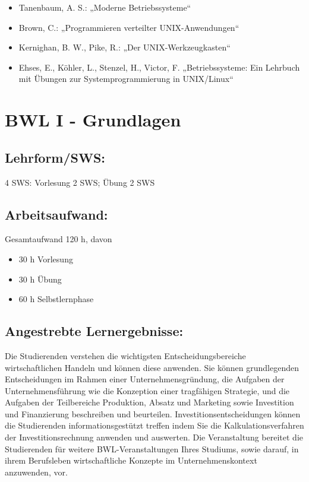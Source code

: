 \begin{itemize}
\tightlist
\item
  Tanenbaum, A. S.: „Moderne Betriebssysteme``
\item
  Brown, C.: „Programmieren verteilter UNIX-Anwendungen``
\item
  Kernighan, B. W., Pike, R.: „Der UNIX-Werkzeugkasten``
\item
  Ehses, E., Köhler, L., Stenzel, H., Victor, F. „Betriebssysteme: Ein
  Lehrbuch mit Übungen zur Systemprogrammierung in UNIX/Linux``
\end{itemize}

\chapter{BWL I - Grundlagen}\label{bwl-i---grundlagen}

\section{Lehrform/SWS:}\label{lehrformsws-6}

4 SWS: Vorlesung 2 SWS; Übung 2 SWS

\section{Arbeitsaufwand:}\label{arbeitsaufwand-6}

Gesamtaufwand 120 h, davon

\begin{itemize}
\tightlist
\item
  30 h Vorlesung
\item
  30 h Übung
\item
  60 h Selbstlernphase
\end{itemize}

\section{Angestrebte
Lernergebnisse:}\label{angestrebte-lernergebnisse-6}

Die Studierenden verstehen die wichtigsten Entscheidungsbereiche
wirtschaftlichen Handeln und können diese anwenden. Sie können
grundlegenden Entscheidungen im Rahmen einer Unternehmensgründung, die
Aufgaben der Unternehmensführung wie die Konzeption einer tragfähigen
Strategie, und die Aufgaben der Teilbereiche Produktion, Absatz und
Marketing sowie Investition und Finanzierung beschreiben und beurteilen.
Investitionsentscheidungen können die Studierenden informationsgestützt
treffen indem Sie die Kalkulationsverfahren der Investitionsrechnung
anwenden und auswerten. Die Veranstaltung bereitet die Studierenden für
weitere BWL-Veranstaltungen Ihres Studiums, sowie darauf, in ihrem
Berufsleben wirtschaftliche Konzepte im Unternehmenskontext anzuwenden,
vor.

